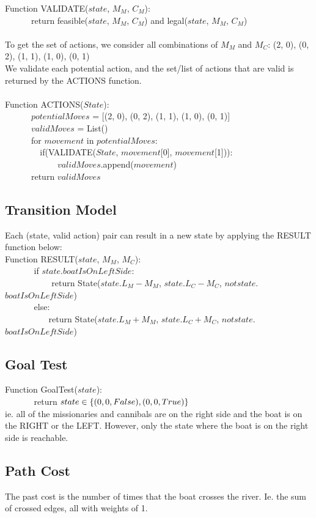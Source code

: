 \documentclass{article}
\begin{document}
\verb||Function VALIDATE($state$, $M_M$, $C_M$):\\
\verb|      |return feasible($state$, $M_M$, $C_M$) and legal($state$, $M_M$, $C_M$)\\\\



To get the set of actions, we consider all combinations of $M_M$ and $M_C$: (2, 0), (0, 2), (1, 1), (1, 0), (0, 1)\\
We validate each potential action, and the set/list of actions that are valid is returned by the ACTIONS function.\\\\
\verb||Function ACTIONS($State$):\\
\verb|      |$potentialMoves$ = [(2, 0), (0, 2), (1, 1), (1, 0), (0, 1)]\\
\verb|      |$validMoves$ = List()\\
\verb|      |for $movement$ in $potentialMoves$:\\
\verb|        |if(VALIDATE($State$, $movement$[0], $movement$[1])):\\
\verb|            |$validMoves$.append($movement$)\\
\verb|      |return $validMoves$\\

    
    
\subsection{Transition Model}
Each (state, valid action) pair can result in a new state by applying the RESULT function below:\\

\verb|| Function RESULT($state$, $M_M$, $M_C$):\\
\verb|      | if $state$.$boatIsOnLeftSide$:\\
\verb|          | return State($state$.$L_M - M_M$, $state$.$L_C - M_C$, $not state$.$boatIsOnLeftSide$)\\
\verb|      | else:\\
\verb|          |return State($state$.$L_M + M_M$, $state$.$L_C + M_C$, $not state$.$boatIsOnLeftSide$)\\

\subsection{Goal Test}
\verb|| Function GoalTest($state$):\\
\verb|      | return $state \in \{ (0,0, False), (0,0, True)\}\\ $\\
    ie. all of the missionaries and cannibals are on the right side and the boat is on the RIGHT or the LEFT. However, only the state where the boat is on the right side is reachable.
    
\subsection{Path Cost}
    The past cost is the number of times that the boat crosses the river. Ie. the sum of crossed edges, all with weights of 1.
    
\end{document}
